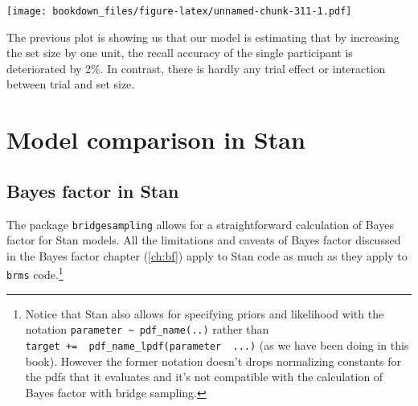 \documentclass[12pt,]{krantz}
\newenvironment{Shaded}{\begin{snugshade}}{\end{snugshade}}
\newcommand{\KeywordTok}[1]{\textcolor[rgb]{0.13,0.29,0.53}{\textbf{#1}}}
\newcommand{\DataTypeTok}[1]{\textcolor[rgb]{0.13,0.29,0.53}{#1}}
\newcommand{\FloatTok}[1]{\textcolor[rgb]{0.00,0.00,0.81}{#1}}
\newcommand{\StringTok}[1]{\textcolor[rgb]{0.31,0.60,0.02}{#1}}
\newcommand{\OperatorTok}[1]{\textcolor[rgb]{0.81,0.36,0.00}{\textbf{#1}}}
\newcommand{\NormalTok}[1]{#1}
\theoremstyle{definition}
\theoremstyle{definition}
\theoremstyle{definition}
\theoremstyle{remark}
\begin{document}
\begin{Shaded}
\end{Shaded}

\texttt{[image: bookdown\_files/figure-latex/unnamed-chunk-311-1.pdf]}

The previous plot is showing us that our model is estimating that by
increasing the set size by one unit, the recall accuracy of the single
participant is deteriorated by 2\%. In contrast, there is hardly any
trial effect or interaction between trial and set size.

\section{Model comparison in Stan}\label{model-comparison-in-stan}

\subsection{Bayes factor in Stan}\label{bayes-factor-in-stan}

The package \texttt{bridgesampling} allows for a straightforward
calculation of Bayes factor for Stan models. All the limitations and
caveats of Bayes factor discussed in the Bayes factor chapter
(\ref{ch:bf}) apply to Stan code as much as they apply to \texttt{brms}
code.\footnote{Notice that Stan also allows for specifying priors and
  likelihood with the notation
  \texttt{parameter\ \textasciitilde{}\ pdf\_name(..)} rather than
  \texttt{target\ +=\ \ pdf\_name\_lpdf(parameter\ \textbar{}\ ...)} (as
  we have been doing in this book). However the former notation doesn't
  drops normalizing constants for the pdfs that it evaluates and it's
  not compatible with the calculation of Bayes factor with bridge
  sampling.}
\end{document}
